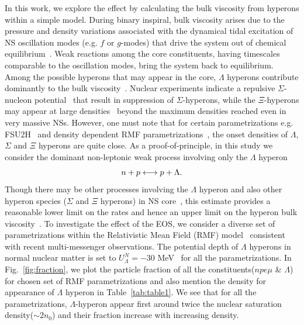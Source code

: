 \documentclass[%
 reprint,
 amsmath,amssymb,
 aps,
]{revtex4-2}
\begin{document}
In this work, we explore the effect by calculating the bulk viscosity from hyperons within a simple model. During binary inspiral, bulk viscosity arises due to the pressure and density variations associated with the dynamical tidal excitation of NS oscillation modes (e.g. $f$ or $g$-modes) that drive the system out of chemical equilibrium~\cite{Jones2001}. Weak reactions among the core constituents, having timescales comparable to the oscillation modes, bring the system back to equilibrium. Among the possible hyperons that may appear in the core, $\Lambda$ hyperons contribute dominantly to the bulk viscosity~\cite{Jones2001,Lindblom2002}. Nuclear experiments indicate a repulsive $\Sigma$-nucleon potential~\cite{FriedmanGal07,SchaffnerGal00,Mares951} that result in suppression of $\Sigma$-hyperons, while the $\Xi$-hyperons may appear at large densities~\cite{Weissenborn2011} beyond the maximum densities reached even in very massive NSs. However, one must note that for certain parametrizations e.g. FSU2H~\cite{Tolos_2017} and density dependent RMF parametrizations~\cite{Adriana_2020,Tu_2022}, the onset densities of $\Lambda$, $\Sigma$ and $\Xi$ hyperons are quite close. As a proof-of-principle, in this study we consider the dominant non-leptonic weak process involving only the $\Lambda$ hyperon 
\begin{equation}\label{eq:Hyp2}
    \centering
    n + p \longleftrightarrow p + \Lambda .
\end{equation}
Though there may be other processes involving the $\Lambda$ hyperon and also other hyperon species ($\Sigma$ and $\Xi$ hyperons) in NS core~\cite{Gusakov_2008}, this estimate provides a reasonable lower limit on the rates and hence an upper limit on the hyperon bulk viscosity~\cite{Gusakov_2008,Jones2001}. To investigate the effect of the EOS, we consider a diverse set of parametrizations within the Relativistic Mean Field (RMF) model~\cite{GM91,Chen2014,Ghosh2022} consistent with recent multi-messenger observations. The potential depth of $\Lambda$ hyperons in normal nuclear matter is set to $U_{\Lambda}^N = -30 $ MeV~\cite{Weissenborn_2012} for all the parametrizations. In Fig.~\ref{fig:fraction}, we plot the particle fraction of all the constituents($npe\mu$ \& $\Lambda$) for chosen set of RMF parametrizations and also mention the density for appearance of $\Lambda$ hyperon in Table~\ref{tab:table1}. We see that for all the parametrizations, $\Lambda$-hyperon appear first around twice the nuclear saturation density($\sim 2n_0$) and their fraction increase with increasing density.
\end{document}
